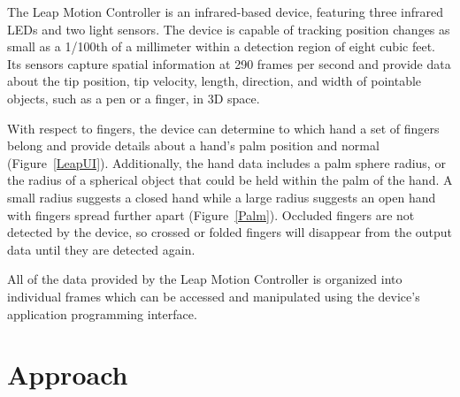 \documentclass[review]{acmsiggraph}
\begin{document}
The Leap Motion Controller is an infrared-based device, featuring three infrared 
LEDs and two light sensors. The device is capable of tracking position changes as 
small as a 1/100th of a millimeter within a detection region of eight cubic feet. Its 
sensors capture spatial information at 290 frames per second and provide data 
about the tip position, tip velocity, length, direction, and width of pointable objects, 
such as a pen or a finger, in 3D space. 

With respect to fingers, the device can determine to which hand a set of fingers 
belong and provide details about a hand's palm position and normal (Figure~\ref{LeapUI}). 
Additionally, the hand data includes a palm sphere radius, or the radius of a spherical
 object that could be held within the palm of the hand. A small radius suggests a closed 
hand while a large radius suggests an open hand with fingers spread further apart (Figure~\ref{Palm}).  
Occluded fingers are not detected by the device, so crossed or folded fingers will 
disappear from the output data until they are detected again.

All of the data provided by the Leap Motion Controller is organized into individual 
frames which can be accessed and manipulated using the device's application programming interface.


\section{Approach}
\end{document}
